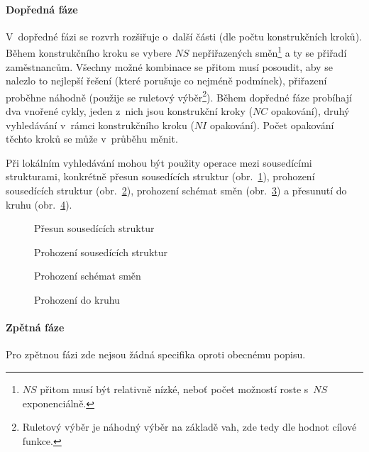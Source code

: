 \documentclass[twoside]{ctuthesis}
\begin{document}
\begin{enumerate}[label=\textbf{O\arabic*.}]
\paragraph{Dopředná fáze} V~dopředné fázi se rozvrh rozšiřuje o~další části (dle počtu konstrukčních kroků). Během konstrukčního kroku se vybere $NS$ nepřiřazených směn\footnote{$NS$ přitom musí být relativně nízké, neboť počet možností roste s~$NS$ exponenciálně. } a ty se přiřadí zaměstnancům. Všechny možné kombinace se přitom musí posoudit, aby se nalezlo to nejlepší řešení (které porušuje co nejméně podmínek), přiřazení proběhne náhodně (použije se ruletový výběr\footnote{Ruletový výběr je náhodný výběr na základě vah, zde tedy dle hodnot cílové funkce.}). Během dopředné fáze probíhají dva vnořené cykly, jeden z~nich jsou konstrukční kroky ($NC$ opakování), druhý vyhledávání v~rámci konstrukčního kroku ($NI$ opakování). Počet opakování těchto kroků se může v~průběhu měnit.

Při lokálním vyhledávání mohou být použity operace mezi sousedícími strukturami, konkrétně přesun sousedících struktur (obr.~\ref{fig:abc-msn}), prohození sousedících struktur (obr.~\ref{fig:abc-sns}), prohození schémat směn (obr.~\ref{fig:abc-sps}) a přesunutí do kruhu (obr.~\ref{fig:abc-trm}).

\begin{figure}[h]
	
	\caption{Přesun sousedících struktur}
	\label{fig:abc-msn}
\end{figure}

\begin{figure}[h!]
	
	\caption{Prohození sousedících struktur}
	\label{fig:abc-sns}
\end{figure}


\begin{figure}[h!]
	
	\caption{Prohození schémat směn}
	\label{fig:abc-sps}
\end{figure}

\begin{figure}[h!]
	
	\caption{Prohození do kruhu}
	\label{fig:abc-trm}
\end{figure}

\paragraph{Zpětná fáze} Pro zpětnou fázi zde nejsou žádná specifika oproti obecnému popisu.

\newpage


\end{enumerate}
\end{document}
